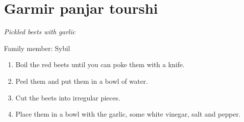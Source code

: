 \chapter{Garmir panjar tourshi}
\label{ch:beets}
\textit{Pickled beets with garlic}

Family member: Sybil



\begin{enumerate}
    \item Boil the red beets until you can poke them with a knife.
    \item Peel them and put them in a bowl of water.
    \item Cut the beets into irregular pieces. 
    \item Place them in a bowl with the garlic, some white vinegar, salt and pepper.
\end{enumerate}
